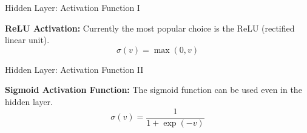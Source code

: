 \documentclass[11pt,compress,t,notes=noshow, xcolor=table]{beamer}
\begin{document}
\begin{framei}{Hidden Layer: Activation Function I}
\item \textbf{ReLU Activation:}
Currently the most popular choice is the ReLU (rectified linear unit).
$$ \sigma (v) = \max(0,v) $$
\end{framei}


\begin{framei}{Hidden Layer: Activation Function II}
\item \textbf{Sigmoid Activation Function:}
The sigmoid function can be used even in the hidden layer.
$$ \sigma(v) = \frac{1}{1+\exp (-v)} $$
\end{framei}







\endlecture
\end{document}
